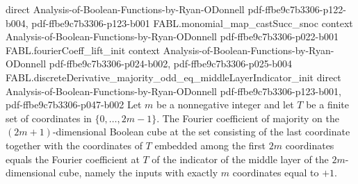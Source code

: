 \begin{theorem}
  {direct}
  {Analysis-of-Boolean-Functions-by-Ryan-ODonnell}
  {pdf-ffbe9c7b3306-p122-b004,
    pdf-ffbe9c7b3306-p123-b001}
\proofstep
  {FABL.monomial_map_castSucc_snoc}
  {context}
  {Analysis-of-Boolean-Functions-by-Ryan-ODonnell}
  {pdf-ffbe9c7b3306-p022-b001}
\proofstep
  {FABL.fourierCoeff_lift_init}
  {context}
  {Analysis-of-Boolean-Functions-by-Ryan-ODonnell}
  {pdf-ffbe9c7b3306-p024-b002,
    pdf-ffbe9c7b3306-p025-b004}
\proofstep
  {FABL.discreteDerivative_majority_odd_eq_middleLayerIndicator_init}
  {direct}
  {Analysis-of-Boolean-Functions-by-Ryan-ODonnell}
  {pdf-ffbe9c7b3306-p123-b001,
    pdf-ffbe9c7b3306-p047-b002}
Let $m$ be a nonnegative integer and let $T$ be a finite set of coordinates in
$\{0,\ldots,2m-1\}$. The Fourier coefficient of majority on the $(2m+1)$-dimensional
Boolean cube at the set consisting of the last coordinate together with the coordinates
of $T$ embedded among the first $2m$ coordinates equals the Fourier coefficient at $T$
of the indicator of the middle layer of the $2m$-dimensional cube, namely the inputs
with exactly $m$ coordinates equal to $+1$.
\end{theorem}

